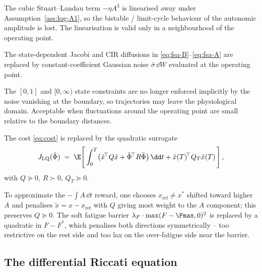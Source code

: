 The cubic Stuart--Landau term $-\eta A^3$ is linearised away under
Assumption~\ref{ass:lqg-A1}, so the bistable / limit-cycle behaviour
of the autonomic amplitude is lost. The linearisation is valid only
in a neighbourhood of the operating point.

\begin{assumption}\label{ass:lqg-A2}
The state-dependent Jacobi and CIR diffusions in
\eqref{eq:fsa-B}--\eqref{eq:fsa-A} are replaced by constant-coefficient
Gaussian noise $\bar\sigma\,\dd W$ evaluated at the operating point.
\end{assumption}

The $[0,1]$ and $[0,\infty)$ state constraints are no longer enforced
implicitly by the noise vanishing at the boundary, so trajectories may
leave the physiological domain. Acceptable when fluctuations around
the operating point are small relative to the boundary distances.

\begin{assumption}\label{ass:lqg-A3}
The cost \eqref{eq:cost} is replaced by the quadratic surrogate
\begin{equation}
  J_{\mathrm{LQ}}(\tilde \Phi)
    \;=\; \E\!\left[\,\int_0^T \bigl(\tilde x^{\!\top} Q \tilde x
                       + \tilde \Phi^{\!\top} R \tilde \Phi\bigr)\,\dd t
                       + \tilde x(T)^{\!\top} Q_T \tilde x(T)\,\right],
  \label{eq:lqg-cost}
\end{equation}
with $Q \succeq 0$, $R \succ 0$, $Q_T \succeq 0$.
\end{assumption}

To approximate the $-\!\int A\,\dd t$ reward, one chooses
$x_{\mathrm{ref}} \neq x^*$ shifted toward higher $A$ and penalises
$\tilde x = x - x_{\mathrm{ref}}$ with $Q$ giving most weight to the
$A$ component; this preserves $Q \succeq 0$. The soft fatigue barrier
$\lambda_F \cdot \max(F-\Fmax,0)^2$ is replaced by a quadratic in
$F-F^*$, which penalises both directions symmetrically -- too
restrictive on the rest side and too lax on the over-fatigue side
near the barrier.

\subsection{The differential Riccati equation}\label{app:lqg-riccati}

